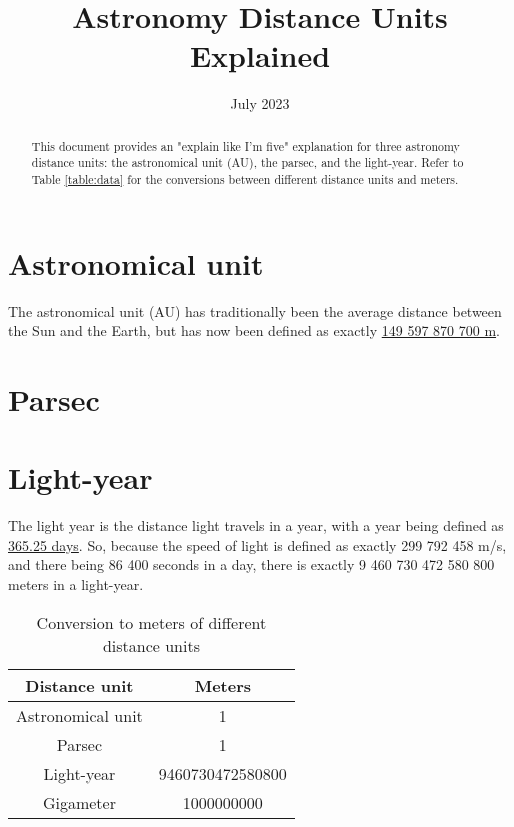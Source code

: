 \documentclass[12pt, letterpaper]{article}
\title{Astronomy Distance Units Explained}
\date{July 2023}
\begin{document}
\maketitle
\begin{abstract}
    \noindent This document provides an "explain like I'm five" explanation for three astronomy distance units:
    \noindent the astronomical unit (AU), the parsec, and the light-year. Refer to Table
    \noindent \ref{table:data} for the conversions between different distance units and meters.
\end{abstract}

\section*{Astronomical unit}  %
The astronomical unit (AU) has traditionally been the average distance between the Sun and the Earth, but has now been defined as exactly \href{https://www.iau.org/static/resolutions/IAU2012_English.pdf}{149 597 870 700 m}.

\section*{Parsec}

\section*{Light-year}
The light year is the distance light travels in a year, with a year being defined as \href{https://web.archive.org/web/20070216041250/http://www.iau.org/Units.234.0.html}{365.25 days}. So,
because the speed of light is defined as exactly 299 792 458 m/s, and there being 86 400 seconds in
a day, there is exactly 9 460 730 472 580 800 meters in a light-year.



\begin{table}[h!]
\centering
    \begin{tabular}{||c c||}
        \hline
        Distance unit & Meters \\ [0.5ex] 
        \hline\hline
        Astronomical unit & 1 \\
        \hline
        Parsec & 1 \\
        \hline
        Light-year & 9460730472580800  \\
        \hline
        Gigameter & 1000000000 \\ [1ex] 
        \hline
    \end{tabular}
\caption{Conversion to meters of different distance units}
\label{table:data}

\end{table}
\end{document}

